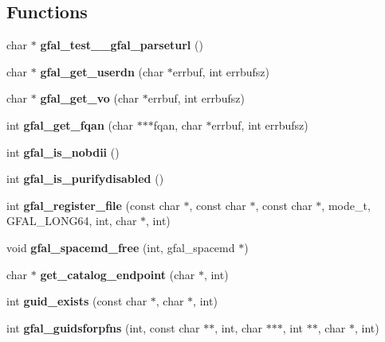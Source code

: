\subsection*{Functions}
\begin{DoxyCompactItemize}
\item 
char $\ast$ {\bfseries gfal\_\-test\_\-\_\-gfal\_\-parseturl} ()\label{group__internal__group_ga9e0d2b4357b62f276cdb1c1da8d6e913}

\item 
char $\ast$ {\bfseries gfal\_\-get\_\-userdn} (char $\ast$errbuf, int errbufsz)\label{group__internal__group_ga0a65e800e9396818f3b01ef6ae303b06}

\item 
char $\ast$ {\bfseries gfal\_\-get\_\-vo} (char $\ast$errbuf, int errbufsz)\label{group__internal__group_ga8e60052f03e2467d47c9ec0276ff9055}

\item 
int {\bfseries gfal\_\-get\_\-fqan} (char $\ast$$\ast$$\ast$fqan, char $\ast$errbuf, int errbufsz)\label{group__internal__group_gae43f4d5830daf7b41ffe2a0a3b3b9332}

\item 
int {\bfseries gfal\_\-is\_\-nobdii} ()\label{group__internal__group_ga2b100652ef6b6edfd20279a2b3ae9ee4}

\item 
int {\bfseries gfal\_\-is\_\-purifydisabled} ()\label{group__internal__group_ga684cea20e69450a9aa50d49131bd0a2d}

\item 
int {\bfseries gfal\_\-register\_\-file} (const char $\ast$, const char $\ast$, const char $\ast$, mode\_\-t, GFAL\_\-LONG64, int, char $\ast$, int)\label{group__internal__group_ga137b2f434fac7f99bf2cde1d53d7c051}

\item 
void {\bfseries gfal\_\-spacemd\_\-free} (int, gfal\_\-spacemd $\ast$)\label{group__internal__group_ga04f27e6a2a3d711cd52f739cad3e8c29}

\item 
char $\ast$ {\bfseries get\_\-catalog\_\-endpoint} (char $\ast$, int)\label{group__internal__group_ga0641c8221f18528a8b2221c1830af995}

\item 
int {\bfseries guid\_\-exists} (const char $\ast$, char $\ast$, int)\label{group__internal__group_ga88bc21acee4d447189ccfb98d8ff3287}

\item 
int {\bfseries gfal\_\-guidsforpfns} (int, const char $\ast$$\ast$, int, char $\ast$$\ast$$\ast$, int $\ast$$\ast$, char $\ast$, int)\label{group__internal__group_gab2de38f8135a16158a629b3bde5eb473}


\end{DoxyCompactItemize}
